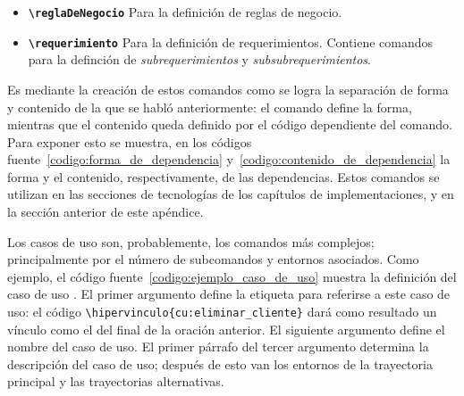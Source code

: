 \begin{itemize}
\begin{itemize}
      \item \textbf{\texttt{{\textbackslash}reglaDeNegocio}}
        Para la definición de reglas de negocio.

      \item \textbf{\texttt{{\textbackslash}requerimiento}}
        Para la definición de requerimientos. Contiene comandos para la
        definción de \textit{subrequerimientos} y \textit{subsubrequerimientos}.

    \end{itemize}

\end{itemize}


Es mediante la creación de estos comandos como se logra la separación de forma
y contenido de la que se habló anteriormente: el comando define la forma,
mientras que el contenido queda definido por el código dependiente del comando.
Para exponer esto se muestra, en los códigos
fuente~\ref{codigo:forma_de_dependencia} y~\ref{codigo:contenido_de_dependencia}
la forma y el contenido, respectivamente, de las dependencias. Estos comandos
se utilizan en las secciones de tecnologías de los capítulos de
implementaciones, y en la sección anterior de este apéndice.



Los casos de uso son, probablemente, los comandos más complejos; principalmente
por el número de subcomandos y entornos asociados. Como ejemplo, el código
fuente~\ref{codigo:ejemplo_caso_de_uso} muestra la definición del caso de uso
. El primer argumento define la etiqueta para
referirse a este caso de uso: el código
\verb|\hipervinculo{cu:eliminar_cliente}| dará como resultado un vínculo como
el del final de la oración anterior. El siguiente argumento define el nombre
del caso de uso. El primer párrafo del tercer argumento determina la
descripción del caso de uso; después de esto van los entornos de la trayectoria
principal y las trayectorias alternativas.

